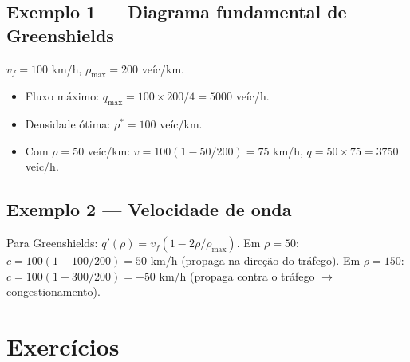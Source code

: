 \documentclass[12pt,a4paper]{article}
\begin{document}
\subsection*{Exemplo 1 --- Diagrama fundamental de Greenshields}
$v_f = 100$ km/h, $\rho_\text{max} = 200$ ve\'ic/km.
\begin{itemize}
  \item Fluxo m\'aximo: $q_\text{max} = 100 \times 200/4 = 5000$ ve\'ic/h.
  \item Densidade \'otima: $\rho^* = 100$ ve\'ic/km.
  \item Com $\rho = 50$ ve\'ic/km: $v = 100(1-50/200) = 75$ km/h, $q = 50\times75 = 3750$ ve\'ic/h.
\end{itemize}

\subsection*{Exemplo 2 --- Velocidade de onda}
Para Greenshields: $q'(\rho) = v_f(1-2\rho/\rho_\text{max})$.
Em $\rho=50$: $c = 100(1-100/200) = 50$ km/h (propaga na dire\c{c}\~ao do tr\'afego).
Em $\rho=150$: $c = 100(1-300/200) = -50$ km/h (propaga contra o tr\'afego $\to$ congestionamento).

\section*{Exerc\'icios}
\end{document}
